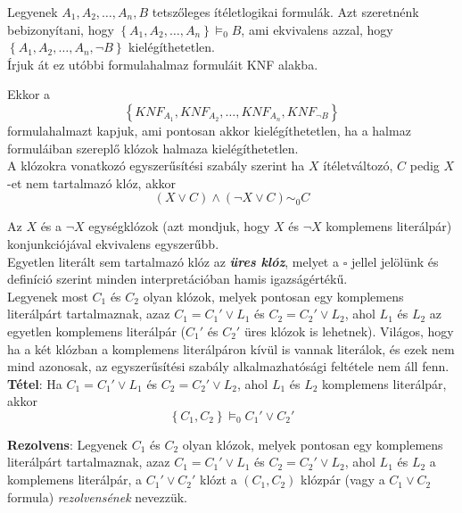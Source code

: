 \documentclass[tikz,12pt,margin=0px]{article}
\begin{document}
    \noindent Legyenek $A_{1}, A_{2}, \ldots , A_{n}, B$ tetszőleges ítéletlogikai formulák. Azt szeretnénk bebizonyítani, hogy $\left\{A_{1}, A_{2}, \ldots , A_{n}\right\} \models_{0} B$, 	ami ekvivalens azzal, hogy $\left\{A_{1}, A_{2}, \ldots , A_{n}, \neg B\right\}$ kielégíthetetlen.\\

    \noindent Írjuk át ez utóbbi formulahalmaz formuláit KNF alakba.

    \noindent Ekkor a
    \[
        \left\{KNF_{A_{1}}, KNF_{A_{2}}, \ldots , KNF_{A_{n}}, KNF_{\neg B}\right\}
    \]
    formulahalmazt kapjuk, ami pontosan akkor kielégíthetetlen, ha a halmaz formuláiban szereplő klózok halmaza kielégíthetetlen.\\
	
    \noindent A klózokra vonatkozó egyszerűsítési szabály szerint ha $X$ ítéletváltozó, $C$ pedig $X$-et nem tartalmazó klóz, akkor
    \[
        (X \vee C) \wedge (\neg X \vee C) \sim_{0} C
    \]

    \noindent Az $X$ és a $\neg X$ egységklózok (azt mondjuk, hogy $X$ és $\neg X$ komplemens literálpár) konjunkciójával ekvivalens egyszerűbb.\\

    \noindent Egyetlen literált sem tartalmazó klóz az \textbf{\emph{üres klóz}}, melyet a $\square$ jellel jelölünk és definíció szerint minden interpretációban hamis igazságértékű.\\
	
    \noindent Legyenek most $C_{1}$ és $C_{2}$ olyan klózok, melyek pontosan egy komplemens literálpárt tartalmaznak, azaz $C_{1} = C_{1}' \vee L_{1}$ és $C_{2} = C_{2}' \vee L_{2}$, ahol $L_{1}$ és $L_{2}$ az egyetlen komplemens literálpár ($C_{1}'$ és $C_{2}'$ üres klózok is lehetnek). Világos, hogy ha a két klózban a komplemens literálpáron kívül is vannak literálok, és ezek nem mind azonosak, az egyszerűsítési szabály alkalmazhatósági feltétele nem áll fenn.\\
	
    \noindent \textbf{Tétel}: Ha $C_{1} = C_{1}' \vee L_{1}$ és $C_{2} = C_{2}' \vee L_{2}$, ahol $L_{1}$ és $L_{2}$ komplemens literálpár, akkor
    \[
        \left\{C_{1},C_{2}\right\} \models_{0} C_{1}' \vee C_{2}'
    \]
	
    \noindent \textbf{Rezolvens}: Legyenek $C_{1}$ és $C_{2}$ olyan klózok, melyek pontosan egy komplemens literálpárt tartalmaznak, azaz $C_{1} = C_{1}' \vee L_{1}$ és $C_{2} = C_{2}' \vee L_{2}$, ahol $L_{1}$ és $L_{2}$ a komplemens literálpár, a $C_{1}' \vee C_{2}'$ klózt a $(C_{1},C_{2})$ klózpár (vagy a $C_{1} \vee C_{2}$ formula) \textit{rezolvensének} nevezzük.\\
\end{document}
